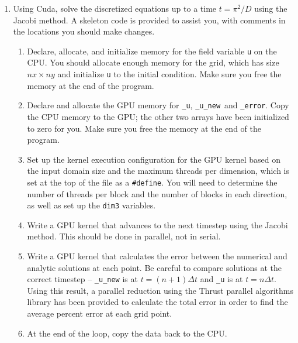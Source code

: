\documentclass[11pt]{article}
\begin{document}
    \vspace{5mm}
    
    \begin{enumerate}
      \item Using Cuda, solve the discretized equations up to a time \(t = \pi^2/D\) using the Jacobi method.
        A skeleton code is provided to assist you, with comments in the locations you should make changes.
        \begin{enumerate}[Step I --]
          \item Declare, allocate, and initialize memory for the field variable \texttt{u} on the CPU.
            You should allocate enough memory for the grid, which has size \(nx \times ny\) and initialize \texttt{u} to the initial condition.
            Make sure you free the memory at the end of the program.
          \item Declare and allocate the GPU memory for \texttt{\_u}, \texttt{\_u\_new}\, and \texttt{\_error}.
            Copy the CPU memory to the GPU; the other two arrays have been initialized to zero for you.
            Make sure you free the memory at the end of the program.
          \item Set up the kernel execution configuration for the GPU kernel based on the input domain size and the maximum threads per dimension,
            which is set at the top of the file as a \texttt{\#define}.
            You will need to determine the number of threads per block and the number of blocks in each direction, as well as set up the \texttt{dim3} variables.
          \item Write a GPU kernel that advances to the next timestep using the Jacobi method.
            This should be done in parallel, not in serial.
          \item Write a GPU kernel that calculates the error between the numerical and analytic solutions at each point.
            Be careful to compare solutions at the correct timestep -- \texttt{\_u\_new} is at \(t = (n+1) \Delta t\) and \texttt{\_u} is at \(t = n \Delta t\).
            Using this result, a parallel reduction using the Thrust parallel algorithms library has been provided to calculate the total error in order to find the average percent error at each grid point.
          \item At the end of the loop, copy the data back to the CPU.
        \end{enumerate}
    \end{enumerate}
    
\end{document}
